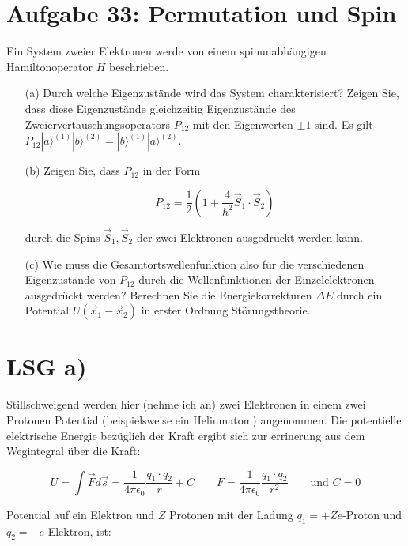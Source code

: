 


\section*{Aufgabe 33: Permutation und Spin}

Ein System zweier Elektronen werde von einem spinunabhängigen Hamiltonoperator \(H\) beschrieben.

\begin{enumerate}
\item[(a)] Durch welche Eigenzustände wird das System charakterisiert? Zeigen Sie, dass diese Eigenzustände gleichzeitig Eigenzustände des Zweiervertauschungsoperators \(P_{12}\) mit den Eigenwerten \(\pm 1\) sind. Es gilt \(P_{12}|a\rangle ^{(1)}|b\rangle ^{(2)} =|b\rangle ^{(1)}|a\rangle ^{(2)} \).

\item[(b)] Zeigen Sie, dass \(P_{12}\) in der Form

\[P_{12}=\frac{1}{2}\left( 1+\frac{4}{\hbar^2}\vec S_1\cdot \vec S_2\right)\]

durch die Spins \(\vec S_1,\vec S_2\) der zwei Elektronen ausgedrückt werden kann.

\item[(c)] Wie muss die Gesamtortswellenfunktion also für die verschiedenen Eigenzustände von \(P_{12}\) durch die Wellenfunktionen der Einzelelektronen ausgedrückt werden? Berechnen Sie die Energiekorrekturen \(\Delta E\) durch ein Potential \(U(\vec x_1-\vec x_2)\) in erster Ordnung Störungstheorie.

\end{enumerate}

\section*{LSG a)}

Stillschweigend werden hier (nehme ich an) zwei Elektronen in einem zwei Protonen Potential (beispielsweise ein Heliumatom) angenommen. Die potentielle elektrische Energie bezüglich der Kraft ergibt sich zur errinerung aus dem Wegintegral über die Kraft:

\[U = \int \vec F d\vec s = \frac{1}{4\pi\epsilon_0}\frac{q_1\cdot q_2}{r}+C \qquad F=  \frac{1}{4\pi\epsilon_0}\frac{q_1\cdot q_2}{r^2} \qquad\text{und } C=0 \]

Potential auf ein Elektron und \(Z\) Protonen mit der Ladung \(q_1=+Ze\)-Proton und \(q_2=-e\)-Elektron, ist:

